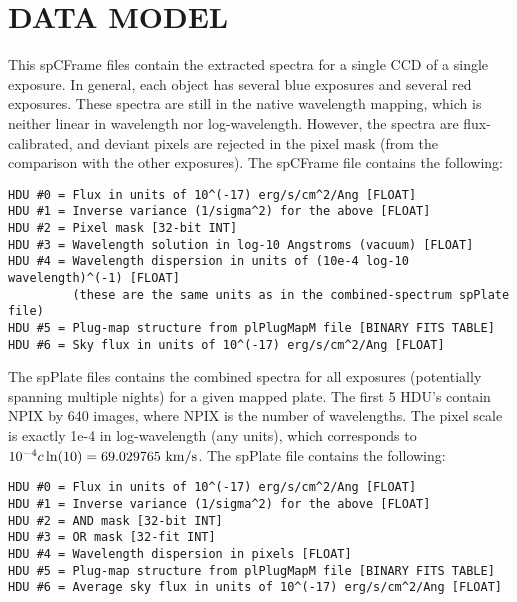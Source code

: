 \documentclass[12pt,preprint]{aastex}
\newcommand{\kms}{{\rm ~km/s}}
\begin{document}
\section{DATA MODEL}
\label{datamodel}

This spCFrame files contain the extracted spectra for a single CCD of a
single exposure. In general, each object has several blue exposures and
several red exposures. These spectra are still in the native wavelength
mapping, which is neither linear in wavelength nor log-wavelength.
However, the spectra are flux-calibrated, and deviant pixels are
rejected in the pixel mask (from the comparison with the other exposures).
The spCFrame file contains the following:
\begin{verbatim}
HDU #0 = Flux in units of 10^(-17) erg/s/cm^2/Ang [FLOAT]
HDU #1 = Inverse variance (1/sigma^2) for the above [FLOAT]
HDU #2 = Pixel mask [32-bit INT]
HDU #3 = Wavelength solution in log-10 Angstroms (vacuum) [FLOAT]
HDU #4 = Wavelength dispersion in units of (10e-4 log-10 wavelength)^(-1) [FLOAT]
         (these are the same units as in the combined-spectrum spPlate file)
HDU #5 = Plug-map structure from plPlugMapM file [BINARY FITS TABLE]
HDU #6 = Sky flux in units of 10^(-17) erg/s/cm^2/Ang [FLOAT]
\end{verbatim}

The spPlate files contains the combined spectra for all exposures
(potentially spanning multiple nights) for a given mapped plate.
The first 5 HDU's contain NPIX by 640 images, where NPIX is the number
of wavelengths. The pixel scale is exactly 1e-4 in log-wavelength
(any units), which corresponds to $10^{-4} c \ln(10) = 69.029765 \kms$.
The spPlate file contains the following:
\begin{verbatim}
HDU #0 = Flux in units of 10^(-17) erg/s/cm^2/Ang [FLOAT]
HDU #1 = Inverse variance (1/sigma^2) for the above [FLOAT]
HDU #2 = AND mask [32-bit INT]
HDU #3 = OR mask [32-fit INT]
HDU #4 = Wavelength dispersion in pixels [FLOAT]
HDU #5 = Plug-map structure from plPlugMapM file [BINARY FITS TABLE]
HDU #6 = Average sky flux in units of 10^(-17) erg/s/cm^2/Ang [FLOAT]
\end{verbatim}
\end{document}
